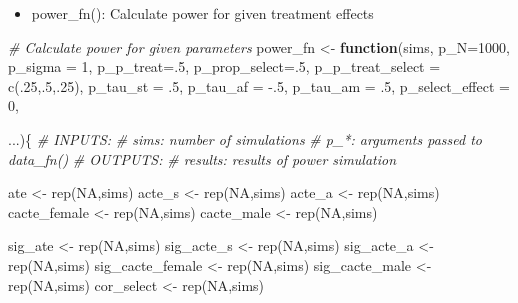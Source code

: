 \documentclass[
]{article}
\newenvironment{Shaded}{\begin{snugshade}}{\end{snugshade}}
\newcommand{\AttributeTok}[1]{\textcolor[rgb]{0.77,0.63,0.00}{#1}}
\newcommand{\CommentTok}[1]{\textcolor[rgb]{0.56,0.35,0.01}{\textit{#1}}}
\newcommand{\ConstantTok}[1]{\textcolor[rgb]{0.00,0.00,0.00}{#1}}
\newcommand{\ControlFlowTok}[1]{\textcolor[rgb]{0.13,0.29,0.53}{\textbf{#1}}}
\newcommand{\DecValTok}[1]{\textcolor[rgb]{0.00,0.00,0.81}{#1}}
\newcommand{\FunctionTok}[1]{\textcolor[rgb]{0.00,0.00,0.00}{#1}}
\newcommand{\NormalTok}[1]{#1}
\newcommand{\OtherTok}[1]{\textcolor[rgb]{0.56,0.35,0.01}{#1}}
\newcommand{\SpecialCharTok}[1]{\textcolor[rgb]{0.00,0.00,0.00}{#1}}
\providecommand{\tightlist}{%
  \setlength{\itemsep}{0pt}\setlength{\parskip}{0pt}}
\begin{document}
\begin{itemize}
\tightlist
\item
  power\_fn(): Calculate power for given treatment effects
\end{itemize}

\begin{Shaded}
\begin{Highlighting}[]
\CommentTok{\# Calculate power for given parameters}
\NormalTok{power\_fn }\OtherTok{\textless{}{-}} \ControlFlowTok{function}\NormalTok{(sims,}
                     \AttributeTok{p\_N=}\DecValTok{1000}\NormalTok{, }
                     \AttributeTok{p\_sigma =} \DecValTok{1}\NormalTok{,}
                     \AttributeTok{p\_p\_treat=}\NormalTok{.}\DecValTok{5}\NormalTok{, }
                     \AttributeTok{p\_prop\_select=}\NormalTok{.}\DecValTok{5}\NormalTok{, }
                     \AttributeTok{p\_p\_treat\_select =} \FunctionTok{c}\NormalTok{(.}\DecValTok{25}\NormalTok{,.}\DecValTok{5}\NormalTok{,.}\DecValTok{25}\NormalTok{), }
                     \AttributeTok{p\_tau\_st =}\NormalTok{ .}\DecValTok{5}\NormalTok{, }
                     \AttributeTok{p\_tau\_af =} \SpecialCharTok{{-}}\NormalTok{.}\DecValTok{5}\NormalTok{,}
                     \AttributeTok{p\_tau\_am =}\NormalTok{ .}\DecValTok{5}\NormalTok{,}
                     \AttributeTok{p\_select\_effect =} \DecValTok{0}\NormalTok{,}
                     
\NormalTok{                     ...)\{}
  \CommentTok{\# INPUTS:}
    \CommentTok{\# sims: number of simulations}
    \CommentTok{\# p\_*: arguments passed to data\_fn()}
  \CommentTok{\# OUTPUTS:}
    \CommentTok{\# results: results of power simulation}
  
\NormalTok{  ate }\OtherTok{\textless{}{-}} \FunctionTok{rep}\NormalTok{(}\ConstantTok{NA}\NormalTok{,sims)}
\NormalTok{  acte\_s }\OtherTok{\textless{}{-}} \FunctionTok{rep}\NormalTok{(}\ConstantTok{NA}\NormalTok{,sims)}
\NormalTok{  acte\_a }\OtherTok{\textless{}{-}} \FunctionTok{rep}\NormalTok{(}\ConstantTok{NA}\NormalTok{,sims)}
\NormalTok{  cacte\_female }\OtherTok{\textless{}{-}} \FunctionTok{rep}\NormalTok{(}\ConstantTok{NA}\NormalTok{,sims)}
\NormalTok{  cacte\_male }\OtherTok{\textless{}{-}} \FunctionTok{rep}\NormalTok{(}\ConstantTok{NA}\NormalTok{,sims)}
  
\NormalTok{  sig\_ate }\OtherTok{\textless{}{-}} \FunctionTok{rep}\NormalTok{(}\ConstantTok{NA}\NormalTok{,sims)}
\NormalTok{  sig\_acte\_s }\OtherTok{\textless{}{-}} \FunctionTok{rep}\NormalTok{(}\ConstantTok{NA}\NormalTok{,sims)}
\NormalTok{  sig\_acte\_a }\OtherTok{\textless{}{-}} \FunctionTok{rep}\NormalTok{(}\ConstantTok{NA}\NormalTok{,sims)}
\NormalTok{  sig\_cacte\_female }\OtherTok{\textless{}{-}} \FunctionTok{rep}\NormalTok{(}\ConstantTok{NA}\NormalTok{,sims)}
\NormalTok{  sig\_cacte\_male }\OtherTok{\textless{}{-}} \FunctionTok{rep}\NormalTok{(}\ConstantTok{NA}\NormalTok{,sims)}
\NormalTok{  cor\_select }\OtherTok{\textless{}{-}} \FunctionTok{rep}\NormalTok{(}\ConstantTok{NA}\NormalTok{,sims)}
  

\end{Highlighting}
\end{Shaded}
\end{document}
